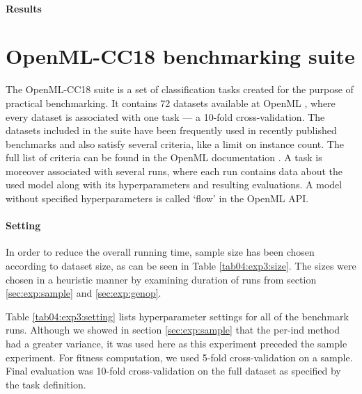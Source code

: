 \paragraph{Results}


\section{OpenML-CC18 benchmarking suite}
The OpenML-CC18 suite is a set of classification tasks created for the purpose
of practical benchmarking. It contains 72 datasets available at OpenML
\citep{openmlcc18}, where
every dataset is associated with one task --- a 10-fold cross-validation. The
datasets included in the suite have been frequently used in recently published
benchmarks and also satisfy several criteria, like a limit on instance count.
The full list of criteria can be found in the OpenML documentation
\citep{openmlcc18docs}. A task is moreover associated with several runs, where
each run contains data about the used model along with its hyperparameters and
resulting evaluations. A model without specified hyperparameters is called
`flow' in the OpenML API.

\paragraph{Setting}
In order to reduce the overall running time, sample size has been chosen
according to dataset size, as can be seen in Table \ref{tab04:exp3:size}.
The sizes were chosen in a heuristic manner by examining duration of runs
from section \ref{sec:exp:sample} and \ref{sec:exp:genop}.

Table \ref{tab04:exp3:setting} lists hyperparameter settings for all of the
benchmark runs. Although we showed in section \ref{sec:exp:sample}
that the per-ind method had a greater variance, it was used here as this
experiment preceded the sample experiment. For fitness computation, we used
5-fold cross-validation on a sample. Final evaluation was 10-fold
cross-validation on the full dataset as specified by the task definition.

